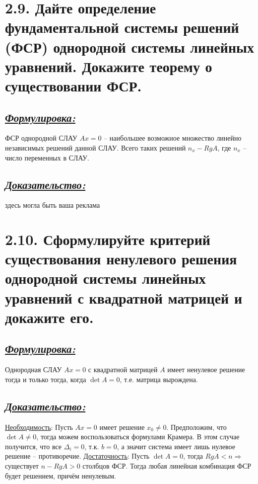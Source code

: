 \documentclass{article}
\begin{document}
\section*{\LARGE 2.9. Дайте определение фундаментальной системы решений (ФСР) однородной системы линейных уравнений. Докажите теорему о существовании ФСР. }
\subsection*{\Large \underline{\textit{Формулировка: }}}
ФСР однородной СЛАУ $Ax = 0$ -- наибольшее возможное множество линейно независимых решений данной СЛАУ. Всего таких решений $n_x -  RgA$, где $n_x$ -- число переменных в СЛАУ.

\subsection*{\Large \underline{\textit{Доказательство: }}}
здесь могла быть ваша реклама

\section*{\LARGE 2.10. Сформулируйте критерий существования ненулевого решения однородной системы линейных уравнений с квадратной матрицей и докажите его. }
\subsection*{\Large \underline{\textit{Формулировка: }}}
Однородная СЛАУ $Ax = 0$ с квадратной матрицей $A$ имеет ненулевое решение тогда и только тогда, когда $\det{A} = 0$, т.е. матрица вырождена.

\subsection*{\Large \underline{\textit{Доказательство: }}}
\underline{Необходимость}:
\newline Пусть $Ax = 0$ имеет решение $x_0 \ne 0$. Предположим, что $\det{A} \ne 0$, тогда можем воспользоваться формулами Крамера. В этом случае получится, что все $\Delta_i = 0$, т.к. $b = 0$, а значит система имеет лишь нулевое решение -- противоречие.
\newline \underline{Достаточность}:
\newline Пусть $\det{A} = 0$, тогда $RgA < n \Rightarrow$ существует $n - RgA > 0$ столбцов ФСР. Тогда любая линейная комбинация ФСР будет решением, причём ненулевым. 
\end{document}
